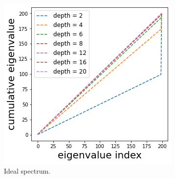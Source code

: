 \begin{figure}
\includegraphics[scale=0.2]{figs/dgn-fra-ecdf-ideal-small.png}
\caption{Ideal spectrum.}
\label{fig:ideal-spectrum}
\end{figure}
